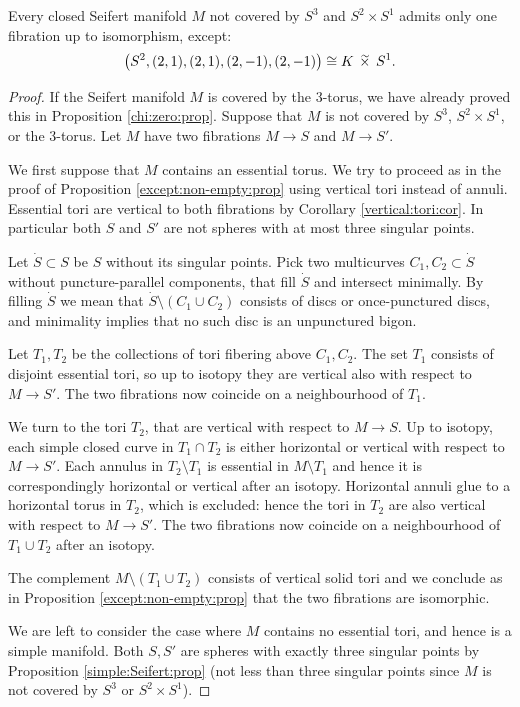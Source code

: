 \begin{prop}
Every closed Seifert manifold $M$ not covered by $S^3$ and $S^2\times S^1$ admits only one fibration up to isomorphism, except:
$$\big(S^2,(2,1),(2,1),(2,-1),(2,-1)\big) \isom K\timtil S^1. $$
\end{prop}
\begin{proof}
If the Seifert manifold $M$ is covered by the 3-torus, we have already proved this in Proposition \ref{chi:zero:prop}. Suppose that $M$ is not covered by $S^3$, $S^2\times S^1$, or the 3-torus. Let $M$ have two fibrations $M\to S$ and $M\to S'$. 

We first suppose that $M$ contains an essential torus. We try to proceed as in the proof of Proposition \ref{except:non-empty:prop} using vertical tori instead of annuli. Essential tori are vertical to both fibrations by Corollary \ref{vertical:tori:cor}. In particular both $S$ and $S'$ are not spheres with at most three singular points.

Let $\dot S\subset S$ be $S$ without its singular points. Pick two multicurves $C_1,C_2 \subset \dot S$ without puncture-parallel components, that fill $\dot S$ and intersect minimally. By filling $\dot S$ we mean that $\dot S \setminus (C_1\cup C_2)$ consists of discs or once-punctured discs, and minimality implies that no such disc is an unpunctured bigon.

Let $T_1, T_2$ be the collections of tori fibering above $C_1, C_2$. The set $T_1$ consists of disjoint essential tori, so up to isotopy they are vertical also with respect to $M\to S'$. The two fibrations now coincide on a neighbourhood of $T_1$. 

We turn to the tori $T_2$, that are vertical with respect to $M\to S$. Up to isotopy, each simple closed curve in $T_1\cap T_2$ is either horizontal or vertical with respect to $M\to S'$. Each annulus in $T_2\setminus T_1$ is essential in $M\setminus T_1$ and hence it is correspondingly horizontal or vertical after an isotopy. Horizontal annuli glue to a horizontal torus in $T_2$, which is excluded: hence the tori in $T_2$ are also vertical with respect to $M\to S'$. The two fibrations now coincide on a neighbourhood of $T_1\cup T_2$ after an isotopy.

The complement $M\setminus (T_1\cup T_2)$ consists of vertical solid tori and we conclude as in Proposition \ref{except:non-empty:prop} that the two fibrations are isomorphic.

We are left to consider the case where $M$ contains no essential tori, and hence is a simple manifold. Both $S,S'$ are spheres with exactly three singular points by Proposition \ref{simple:Seifert:prop} (not less than three singular points since $M$ is not covered by $S^3$ or $S^2\times S^1$). 


\end{proof}

